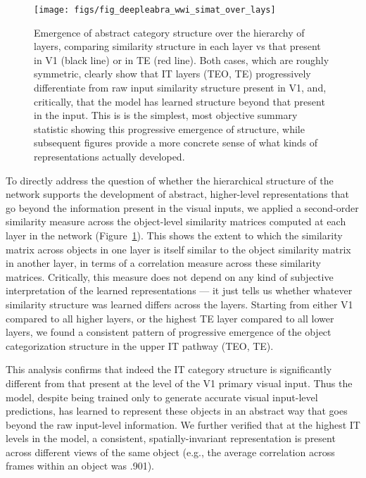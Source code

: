 \documentclass[11pt,twoside]{article}
\newif\myifpdf
\begin{document}
\begin{figure}
  \centering\texttt{[image: figs/fig\_deepleabra\_wwi\_simat\_over\_lays]}
  \caption{\footnotesize Emergence of abstract category structure over the hierarchy of layers, comparing similarity structure in each layer vs that present in V1 (black line) or in TE (red line).  Both cases, which are roughly symmetric, clearly show that IT layers (TEO, TE) progressively differentiate from raw input similarity structure present in V1, and, critically, that the model has learned structure beyond that present in the input.  This is is the simplest, most objective summary statistic showing this progressive emergence of structure, while subsequent figures provide a more concrete sense of what kinds of representations actually developed.}
  \label{fig.simat-lays}
\end{figure}

To directly address the question of whether the hierarchical structure of the network supports the development of abstract, higher-level representations that go beyond the information present in the visual inputs, we applied a second-order similarity measure across the object-level similarity matrices computed at each layer in the network (Figure~\ref{fig.simat-lays}).  This shows the extent to which the similarity matrix across objects in one layer is itself similar to the object similarity matrix in another layer, in terms of a correlation measure across these similarity matrices.  Critically, this measure does not depend on any kind of subjective interpretation of the learned representations --- it just tells us whether whatever similarity structure was learned differs across the layers.  Starting from either V1 compared to all higher layers, or the highest TE layer compared to all lower layers, we found a consistent pattern of progressive emergence of the object categorization structure in the upper IT pathway (TEO, TE).

This analysis confirms that indeed the IT category structure is significantly different from that present at the level of the V1 primary visual input.  Thus the model, despite being trained only to generate accurate visual input-level predictions, has learned to represent these objects in an abstract way that goes beyond the raw input-level information.  We further verified that at the highest IT levels in the model, a consistent, spatially-invariant representation is present across different views of the same object (e.g., the average correlation across frames within an object was .901).
\end{document}
